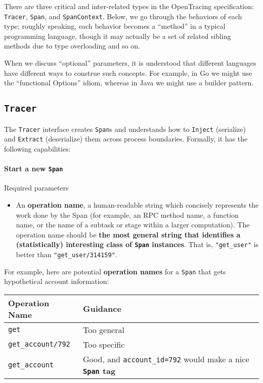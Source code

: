 \documentclass[a4paper,12pt,notitlepage,twoside,openright]{article}
\begin{document}
There are three critical and inter-related types in the OpenTracing
specification: \texttt{Tracer}, \texttt{Span}, and \texttt{SpanContext}.
Below, we go through the behaviors of each type; roughly speaking, each
behavior becomes a ``method'' in a typical programming language, though
it may actually be a set of related sibling methods due to type
overloading and so on.

When we discuss ``optional'' parameters, it is understood that different
languages have different ways to construe such concepts. For example, in
Go we might use the ``functional Options'' idiom, whereas in Java we
might use a builder pattern.

\hypertarget{tracer}{%
\subsection{\texorpdfstring{\texttt{Tracer}}{Tracer}}\label{tracer}}

The \texttt{Tracer} interface creates \texttt{Span}s and understands how
to \texttt{Inject} (serialize) and \texttt{Extract} (deserialize) them
across process boundaries. Formally, it has the following capabilities:

\hypertarget{start-a-new-span}{%
\paragraph{\texorpdfstring{Start a new
\texttt{Span}}{Start a new Span}}\label{start-a-new-span}}

Required parameters

\begin{itemize}

\item
  An \textbf{operation name}, a human-readable string which concisely
  represents the work done by the Span (for example, an RPC method name,
  a function name, or the name of a subtask or stage within a larger
  computation). The operation name should be \textbf{the most general
  string that identifies a (statistically) interesting class of
  \texttt{Span} instances}. That is, \texttt{"get\_user"} is better than
  \texttt{"get\_user/314159"}.
\end{itemize}

For example, here are potential \textbf{operation names} for a
\texttt{Span} that gets hypothetical account information:

\begin{longtable}[]{@{}ll@{}}
\toprule
Operation Name & Guidance\tabularnewline
\midrule
\endhead
\texttt{get} & Too general\tabularnewline
\texttt{get\_account/792} & Too specific\tabularnewline
\texttt{get\_account} & Good, and \texttt{account\_id=792} would make a
nice \textbf{\texttt{Span} tag}\tabularnewline
\bottomrule
\end{longtable}
\end{document}
